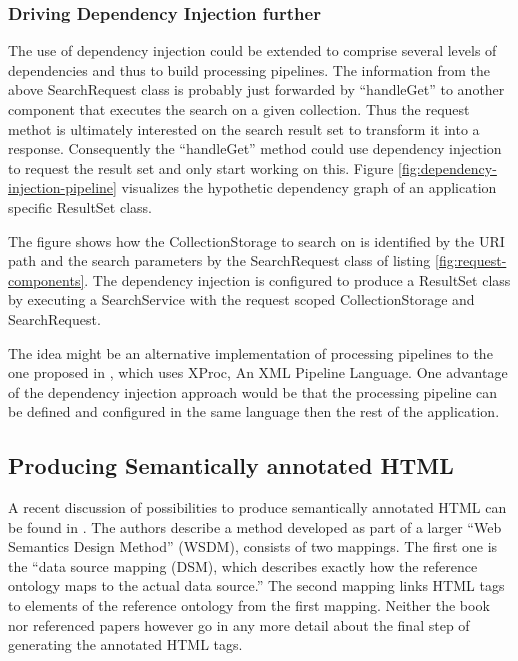 \documentclass[12pt,a4paper,twoside]{scrartcl}		%
\begin{document}
\subsubsection{Driving Dependency Injection further}

The use of dependency injection could be extended to comprise several levels of
dependencies and thus to build processing pipelines.  The information from the
above SearchRequest class is probably just forwarded by ``handleGet'' to another
component that executes the search on a given collection. Thus the request
methot is ultimately interested on the search result set to transform it into a
response. Consequently the ``handleGet'' method could use dependency injection
to request the result set and only start working on this. Figure
\ref{fig:dependency-injection-pipeline} visualizes the hypothetic dependency
graph of an application specific ResultSet class.

The figure shows how the CollectionStorage to search on is identified by the URI
path and the search parameters by the SearchRequest class of listing
\ref{fig:request-components}. The dependency injection is configured to produce
a ResultSet class by executing a SearchService with the request scoped
CollectionStorage and SearchRequest.

The idea might be an alternative implementation of processing pipelines to the
one proposed in \cite{Davis:2011:XTR:1967428.1967437}, which uses XProc, An XML
Pipeline Language. One advantage of the dependency injection approach would be
that the processing pipeline can be defined and configured in the same language
then the rest of the application.


\subsection{Producing Semantically annotated HTML}

A recent discussion of possibilities to produce semantically annotated HTML can
be found in \cite[sec. 9.1.3]{DBLP:books/daglib/0023755}. The authors describe a
method developed as part of a larger ``Web Semantics Design Method'' (WSDM),
consists of two mappings. The first one is the ``data source mapping (DSM),
which describes exactly how the reference ontology maps to the actual data
source.''  The second mapping links HTML tags to elements of the reference
ontology from the first mapping. Neither the book nor referenced papers however
go in any more detail about the final step of generating the annotated HTML
tags.
\end{document}
